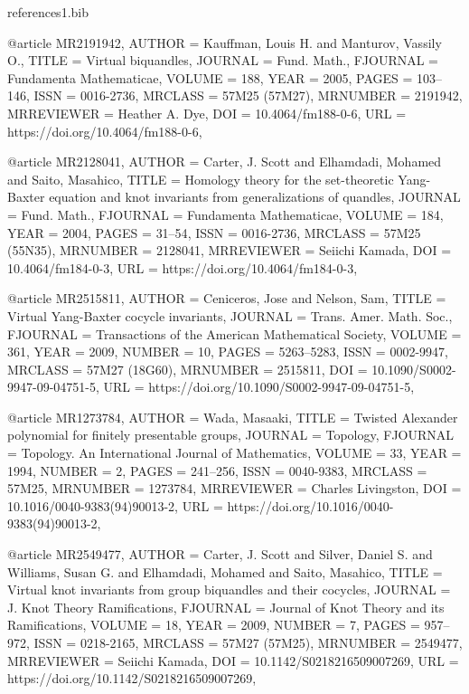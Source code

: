 \documentclass[11pt, reqno]{amsart}
\theoremstyle{definition}
\begin{document}
\begin{filecontents*}[overwrite]{references1.bib}
	
@article {MR2191942,
    AUTHOR = {Kauffman, Louis H. and Manturov, Vassily O.},
     TITLE = {Virtual biquandles},
   JOURNAL = {Fund. Math.},
  FJOURNAL = {Fundamenta Mathematicae},
    VOLUME = {188},
      YEAR = {2005},
     PAGES = {103--146},
      ISSN = {0016-2736},
   MRCLASS = {57M25 (57M27)},
  MRNUMBER = {2191942},
MRREVIEWER = {Heather A. Dye},
       DOI = {10.4064/fm188-0-6},
       URL = {https://doi.org/10.4064/fm188-0-6},
}


@article {MR2128041,
    AUTHOR = {Carter, J. Scott and Elhamdadi, Mohamed and Saito, Masahico},
     TITLE = {Homology theory for the set-theoretic {Y}ang-{B}axter equation
              and knot invariants from generalizations of quandles},
   JOURNAL = {Fund. Math.},
  FJOURNAL = {Fundamenta Mathematicae},
    VOLUME = {184},
      YEAR = {2004},
     PAGES = {31--54},
      ISSN = {0016-2736},
   MRCLASS = {57M25 (55N35)},
  MRNUMBER = {2128041},
MRREVIEWER = {Seiichi Kamada},
       DOI = {10.4064/fm184-0-3},
       URL = {https://doi.org/10.4064/fm184-0-3},
}


@article {MR2515811,
    AUTHOR = {Ceniceros, Jose and Nelson, Sam},
     TITLE = {Virtual {Y}ang-{B}axter cocycle invariants},
   JOURNAL = {Trans. Amer. Math. Soc.},
  FJOURNAL = {Transactions of the American Mathematical Society},
    VOLUME = {361},
      YEAR = {2009},
    NUMBER = {10},
     PAGES = {5263--5283},
      ISSN = {0002-9947},
   MRCLASS = {57M27 (18G60)},
  MRNUMBER = {2515811},
       DOI = {10.1090/S0002-9947-09-04751-5},
       URL = {https://doi.org/10.1090/S0002-9947-09-04751-5},
}

@article {MR1273784,
	AUTHOR = {Wada, Masaaki},
	TITLE = {Twisted {A}lexander polynomial for finitely presentable
		groups},
	JOURNAL = {Topology},
	FJOURNAL = {Topology. An International Journal of Mathematics},
	VOLUME = {33},
	YEAR = {1994},
	NUMBER = {2},
	PAGES = {241--256},
	ISSN = {0040-9383},
	MRCLASS = {57M25},
	MRNUMBER = {1273784},
	MRREVIEWER = {Charles Livingston},
	DOI = {10.1016/0040-9383(94)90013-2},
	URL = {https://doi.org/10.1016/0040-9383(94)90013-2},
}

@article {MR2549477,
	AUTHOR = {Carter, J. Scott and Silver, Daniel S. and Williams, Susan G.
		and Elhamdadi, Mohamed and Saito, Masahico},
	TITLE = {Virtual knot invariants from group biquandles and their
		cocycles},
	JOURNAL = {J. Knot Theory Ramifications},
	FJOURNAL = {Journal of Knot Theory and its Ramifications},
	VOLUME = {18},
	YEAR = {2009},
	NUMBER = {7},
	PAGES = {957--972},
	ISSN = {0218-2165},
	MRCLASS = {57M27 (57M25)},
	MRNUMBER = {2549477},
	MRREVIEWER = {Seiichi Kamada},
	DOI = {10.1142/S0218216509007269},
	URL = {https://doi.org/10.1142/S0218216509007269},
}


\end{filecontents*}
\end{document}
